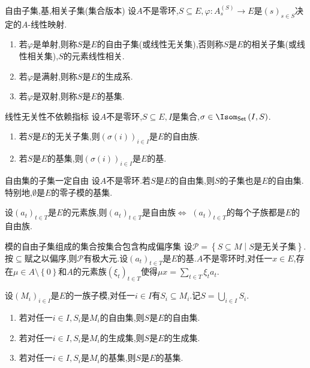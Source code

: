 \begin{definition}{自由子集,基,相关子集(集合版本)}{}
	设$A$不是零环,$S\subseteq E,\varphi:A_{s}^{\left(S\right)}\to E$是$\left(s\right)_{s\in S}$决定的$A$-线性映射.
	\begin{enumerate}
		\item 若$\varphi$是单射,则称$S$是$E$的自由子集(或线性无关集),否则称$S$是$E$的相关子集(或线性相关集),$S$的元素线性相关.
		\item 若$\varphi$是满射,则称$S$是$E$的生成系.
		\item 若$\varphi$是双射,则称$S$是$E$的基集.
	\end{enumerate}
\end{definition}

\begin{proposition}{线性无关性不依赖指标}{}
	设$A$不是零环,$S\subseteq E,I$是集合,$\sigma\in\Isom_{\mathsf{Set}}\left(I,S\right)$.
	\begin{enumerate}
		\item 若$S$是$E$的无关子集,则$\left(\sigma\left(i\right)\right)_{i\in I}$是$E$的自由族.
		\item 若$S$是$E$的基集,则$\left(\sigma\left(i\right)\right)_{i\in I}$是$E$的基.
	\end{enumerate}
\end{proposition}

\begin{proposition}{自由集的子集一定自由}{}
	设$A$不是零环.若$S$是$E$的自由集,则$S$的子集也是$E$的自由集.特别地,$\emptyset$是$E$的零子模的基集.
\end{proposition}

\begin{proposition}{}{}
	设$\left(a_{t}\right)_{t\in T}$是$E$的元素族,则$\left(a_{t}\right)_{t\in T}$是自由族$\iff$ $\left(a_{t}\right)_{t\in T}$的每个子族都是$E$的自由族.
\end{proposition}

\begin{remark}{模的自由子集组成的集合按集合包含构成偏序集}{}
	设$\mathcal{P}=\left\{S\subseteq M\middle|S\text{是无关子集}\right\}$.按$\subseteq$赋之以偏序,则$\mathcal{P}$有极大元.设$\left(a_{t}\right)_{t\in T}$是$E$的基.$A$不是零环时,对任一$x\in E$,存在$\mu\in A\setminus\left\{0\right\}$和$A$的元素族$\left(\xi_{t}\right)_{t\in T}$使得$\mu x=\sum\limits_{t\in T}\xi_{t}a_{t}$.
\end{remark}

\begin{proposition}{}{}
	设$\left(M_{i}\right)_{i\in I}$是$E$的一族子模,对任一$i\in I$有$S_{i}\subseteq M_{i}$.记$S=\bigcup\limits_{i\in I}S_{i}$.
	\begin{enumerate}
		\item 若对任一$i\in I,S_{i}$是$M_{i}$的自由集,则$S$是$E$的自由集.
		\item 若对任一$i\in I,S_{i}$是$M_{i}$的生成集,则$S$是$E$的生成集.
		\item 若对任一$i\in I,S_{i}$是$M_{i}$的基集,则$S$是$E$的基集.
	\end{enumerate}	
\end{proposition}

